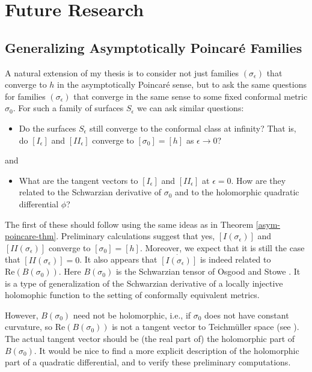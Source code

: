 \documentclass[11pt]{amsart}
\newcommand{\two}{I\!\!I}
\begin{document}
\section{Future Research} \label{research plan}


\subsection{Generalizing Asymptotically Poincar\'e Families} \label{generalize families}
A natural extension of my thesis is to consider not just families $(\sigma_\epsilon)$ that converge to $h$ in the asymptotically Poincar\'e sense, but to ask the same questions for families $(\sigma_\epsilon)$ that converge in the same sense to some fixed conformal metric $\sigma_0$. 
For such a family of surfaces $S_\epsilon$ we can ask similar questions:
\begin{itemize}
\item Do the surfaces $S_\epsilon$ still converge to the conformal class at infinity? 
That is, do $[I_\epsilon]$ and $[I\!I_\epsilon]$ converge to $[\sigma_0] = [h]$ as $\epsilon \to 0$?
\end{itemize}
and 
\begin{itemize}
\item What are the tangent vectors to $[I_\epsilon]$ and $[I\!I_\epsilon]$ at $\epsilon =0$. 
How are they related to the Schwarzian derivative of $\sigma_0$ and to the holomorphic quadratic differential $\phi$? 
\end{itemize}
The first of these should follow using the same ideas as in Theorem \ref{asym-poincare-thm}. 
Preliminary calculations suggest that yes, $[I(\sigma_\epsilon)]$ and $[\two(\sigma_\epsilon)]$ converge to $[\sigma_0] = [h]$.
Moreover, we expect that it is still the case that $\dot{[\two(\sigma_\epsilon)]} = 0$.
It also appears that $\dot{[I(\sigma_\epsilon)]}$ is indeed related to $\mathrm{Re}(B(\sigma_0))$.
Here $B(\sigma_0)$ is the Schwarzian tensor of Osgood and Stowe \cite{osgood-stowe1992}.
It is a type of generalization of the Schwarzian derivative of a locally injective holomophic function to the setting of conformally equivalent metrics. 

However, $B(\sigma_0)$ need not be holomorphic, i.e., if $\sigma_0$ does not have constant curvature, so $\mathrm{Re}(B(\sigma_0))$ is not a tangent vector to Teichm\"uller space (see \cite{tromba1992}). The actual tangent vector should be (the real part of) the holomorphic part of $B(\sigma_0)$. 
It would be nice to find a more explicit description of the holomorphic part of a quadratic differential, and to verify these preliminary computations.
\end{document}
